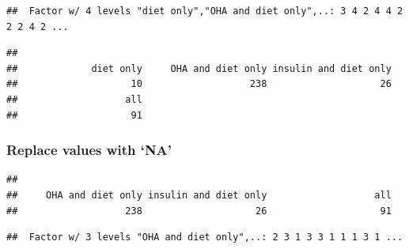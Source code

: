 \documentclass[]{book}
\newenvironment{Shaded}{\begin{snugshade}}{\end{snugshade}}
\newcommand{\KeywordTok}[1]{\textcolor[rgb]{0.13,0.29,0.53}{\textbf{#1}}}
\newcommand{\StringTok}[1]{\textcolor[rgb]{0.31,0.60,0.02}{#1}}
\newcommand{\OtherTok}[1]{\textcolor[rgb]{0.56,0.35,0.01}{#1}}
\newcommand{\OperatorTok}[1]{\textcolor[rgb]{0.81,0.36,0.00}{\textbf{#1}}}
\newcommand{\NormalTok}[1]{#1}
\theoremstyle{definition}
\theoremstyle{definition}
\theoremstyle{remark}
\begin{document}
\begin{verbatim}
##  Factor w/ 4 levels "diet only","OHA and diet only",..: 3 4 2 4 4 2 2 2 4 2 ...
\end{verbatim}

\begin{Shaded}
\end{Shaded}

\begin{verbatim}
## 
##             diet only     OHA and diet only insulin and diet only 
##                    10                   238                    26 
##                   all 
##                    91
\end{verbatim}

\subsubsection{\texorpdfstring{Replace values with
`NA'}{Replace values with NA}}\label{replace-values-with-na}

\begin{Shaded}
\end{Shaded}

\begin{verbatim}
## 
##     OHA and diet only insulin and diet only                   all 
##                   238                    26                    91
\end{verbatim}

\begin{Shaded}
\end{Shaded}

\begin{verbatim}
##  Factor w/ 3 levels "OHA and diet only",..: 2 3 1 3 3 1 1 1 3 1 ...
\end{verbatim}
\end{document}
